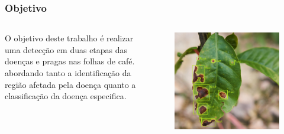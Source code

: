 \documentclass[aspectratio=169]{beamer}
\begin{document}


\begin{frame}
    \frametitle{Objetivo}

    \begin{columns}



        O objetivo deste trabalho é realizar uma detecção em duas etapas das doenças e pragas nas folhas de café. abordando tanto a identificação da região afetada pela doença quanto a classificação da doença especifica.


        \vspace{-0.5cm}
        \begin{figure}
            \centering
            \includegraphics[scale = 0.2]{img/folhaExemplloDetectada.jpg}
        \end{figure}


    \end{columns}

\end{frame}


\end{document}
